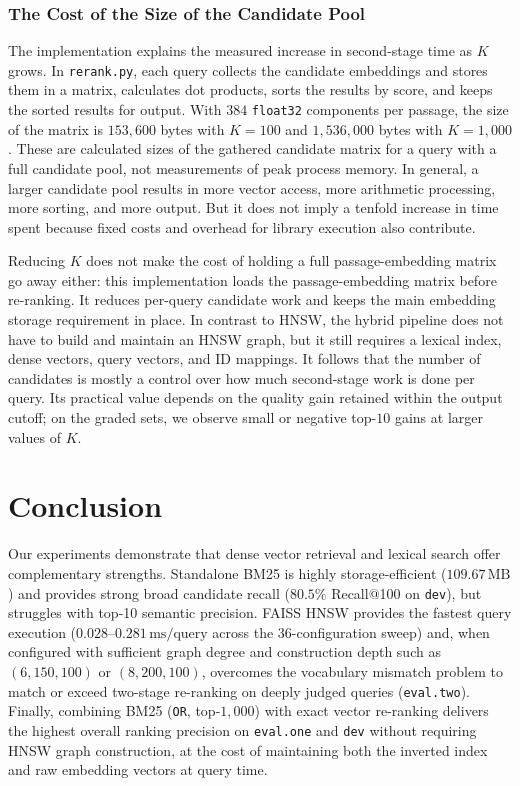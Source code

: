 \documentclass[11pt]{article}
\begin{document}
\subsubsection{The Cost of the Size of the Candidate Pool}
The implementation explains the measured increase in second-stage time as $K$ grows. In \texttt{rerank.py}, each query collects the candidate embeddings and stores them in a matrix, calculates dot products, sorts the results by score, and keeps the sorted results for output. With $384$ \texttt{float32} components per passage, the size of the matrix is $153{,}600$ bytes with $K=100$ and $1{,}536{,}000$ bytes with $K=1{,}000$. These are calculated sizes of the gathered candidate matrix for a query with a full candidate pool, not measurements of peak process memory. In general, a larger candidate pool results in more vector access, more arithmetic processing, more sorting, and more output. But it does not imply a tenfold increase in time spent because fixed costs and overhead for library execution also contribute.

Reducing $K$ does not make the cost of holding a full passage-embedding matrix go away either: this implementation loads the passage-embedding matrix before re-ranking. It reduces per-query candidate work and keeps the main embedding storage requirement in place. In contrast to HNSW, the hybrid pipeline does not have to build and maintain an HNSW graph, but it still requires a lexical index, dense vectors, query vectors, and ID mappings. It follows that the number of candidates is mostly a control over how much second-stage work is done per query. Its practical value depends on the quality gain retained within the output cutoff; on the graded sets, we observe small or negative top-$10$ gains at larger values of $K$.

\section{Conclusion}
Our experiments demonstrate that dense vector retrieval and lexical search offer complementary strengths. Standalone BM25 is highly storage-efficient ($109.67\,\text{MB}$) and provides strong broad candidate recall ($80.5\%$ Recall@100 on \texttt{dev}), but struggles with top-10 semantic precision. FAISS HNSW provides the fastest query execution ($0.028$--$0.281\,\text{ms/query}$ across the 36-configuration sweep) and, when configured with sufficient graph degree and construction depth such as $(6, 150, 100)$ or $(8, 200, 100)$, overcomes the vocabulary mismatch problem to match or exceed two-stage re-ranking on deeply judged queries (\texttt{eval.two}). Finally, combining BM25 (\texttt{OR}, top-$1{,}000$) with exact vector re-ranking delivers the highest overall ranking precision on \texttt{eval.one} and \texttt{dev} without requiring HNSW graph construction, at the cost of maintaining both the inverted index and raw embedding vectors at query time.
\end{document}
